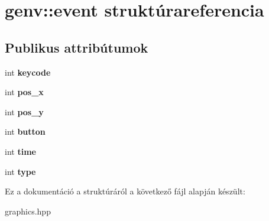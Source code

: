 \hypertarget{structgenv_1_1event}{}\section{genv\+:\+:event struktúrareferencia}
\label{structgenv_1_1event}
\subsection*{Publikus attribútumok}
\begin{DoxyCompactItemize}
\item 
\mbox{\label{structgenv_1_1event_a80bbbf715307eab046126ad5ddc25429}} 
int {\bfseries keycode}
\item 
\mbox{\label{structgenv_1_1event_a3b0cc38e48dcbcb6beecf065278bb7f3}} 
int {\bfseries pos\+\_\+x}
\item 
\mbox{\label{structgenv_1_1event_a3da71f2e3942f349436ec9475f30bba7}} 
int {\bfseries pos\+\_\+y}
\item 
\mbox{\label{structgenv_1_1event_ab25aa638d0d9df2b5a3d3fabd5c915bd}} 
int {\bfseries button}
\item 
\mbox{\label{structgenv_1_1event_aa02e509f3a8a8e96edafb9547d351686}} 
int {\bfseries time}
\item 
\mbox{\label{structgenv_1_1event_a750e19a440a750514e905c6dcefd017c}} 
int {\bfseries type}
\end{DoxyCompactItemize}


Ez a dokumentáció a struktúráról a következő fájl alapján készült\+:\begin{DoxyCompactItemize}
\item 
graphics.\+hpp\end{DoxyCompactItemize}

